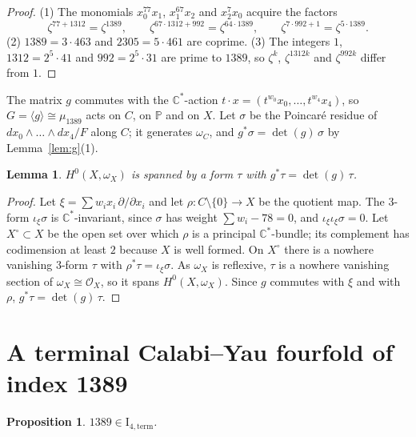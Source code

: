 \documentclass{amsart}
\newtheorem{lemma}[theorem]{Lemma}
\newtheorem{proposition}[theorem]{Proposition}
\theoremstyle{remark}
\newcommand{\It}{\mathrm{I}_{4,\mathrm{term}}}
\newcommand{\C}{\mathbb{C}}
\newcommand{\PP}{\mathbb{P}}
\begin{document}
\begin{proof}
(1) The monomials $x_0^{77}x_1$, $x_1^{67}x_2$ and $x_2^7x_0$ acquire the factors
\[
\zeta^{77+1312}=\zeta^{1389},\qquad\zeta^{67\cdot1312+992}=\zeta^{64\cdot1389},\qquad\zeta^{7\cdot992+1}=\zeta^{5\cdot1389}.
\] (2) $1389=3\cdot463$ and $2305=5\cdot461$ are coprime. (3) The integers $1$, $1312=2^5\cdot41$ and $992=2^5\cdot31$ are prime to $1389$, so $\zeta^k$, $\zeta^{1312k}$ and $\zeta^{992k}$ differ from $1$.
\end{proof}

The matrix $g$ commutes with the $\C^*$-action $t\cdot x=(t^{w_0}x_0,\dots,t^{w_4}x_4)$, so $G=\langle g\rangle\cong\mu_{1389}$ acts on $C$, on $\PP$ and on $X$. Let $\sigma$ be the Poincar\'e residue of $dx_0\wedge\dots\wedge dx_4/F$ along $C$; it generates $\omega_C$, and $g^*\sigma=\det(g)\,\sigma$ by Lemma~\ref{lem:g}(1).

\begin{lemma}\label{lem:omega}
$H^0(X,\omega_X)$ is spanned by a form $\tau$ with $g^*\tau=\det(g)\,\tau$.
\end{lemma}

\begin{proof}
Let $\xi=\sum w_ix_i\,\partial/\partial x_i$ and let $\rho\colon C\setminus\{0\}\to X$ be the quotient map. The $3$-form $\iota_\xi\sigma$ is $\C^*$-invariant, since $\sigma$ has weight $\sum w_i-78=0$, and $\iota_\xi\iota_\xi\sigma=0$. Let $X^\circ\subset X$ be the open set over which $\rho$ is a principal $\C^*$-bundle; its complement has codimension at least $2$ because $X$ is well formed. On $X^\circ$ there is a nowhere vanishing $3$-form $\tau$ with $\rho^*\tau=\iota_\xi\sigma$. As $\omega_X$ is reflexive, $\tau$ is a nowhere vanishing section of $\omega_X\cong\mathcal O_X$, so it spans $H^0(X,\omega_X)$. Since $g$ commutes with $\xi$ and with $\rho$, $g^*\tau=\det(g)\,\tau$.
\end{proof}

\section{A terminal Calabi--Yau fourfold of index 1389}\label{sec:term}

\begin{proposition}\label{prop:term}
$1389\in\It$.
\end{proposition}
\end{document}
